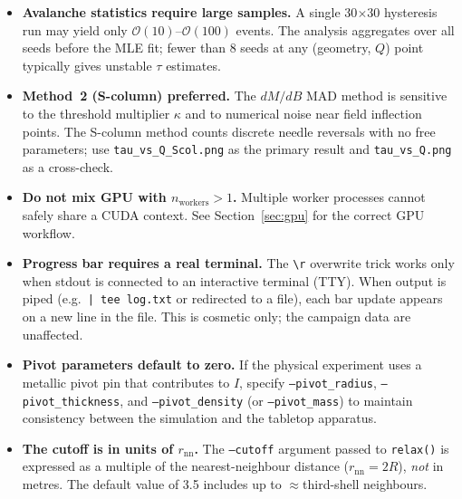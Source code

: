 \documentclass[11pt,a4paper]{article}
\newcommand{\code}[1]{\texttt{#1}}
\newcommand{\file}[1]{\texttt{#1}}
\newcommand{\param}[1]{\texttt{--#1}}
\begin{document}
\begin{itemize}
  \item \textbf{Avalanche statistics require large samples.}  A single 30$\times$30
    hysteresis run may yield only $\mathcal{O}(10)$--$\mathcal{O}(100)$ events.
    The analysis aggregates over all seeds before the MLE fit; fewer than
    8 seeds at any (geometry, $Q$) point typically gives unstable $\tau$ estimates.

  \item \textbf{Method~2 (S-column) preferred.}  The $dM/dB$ MAD method is sensitive
    to the threshold multiplier $\kappa$ and to numerical noise near field
    inflection points.  The S-column method counts discrete needle reversals
    with no free parameters; use \file{tau\_vs\_Q\_Scol.png} as the primary result
    and \file{tau\_vs\_Q.png} as a cross-check.

  \item \textbf{Do not mix GPU with $n_{\mathrm{workers}} > 1$.}  Multiple worker
    processes cannot safely share a CUDA context.  See
    Section~\ref{sec:gpu} for the correct GPU workflow.

  \item \textbf{Progress bar requires a real terminal.}  The \texttt{\textbackslash r}
    overwrite trick works only when stdout is connected to an interactive
    terminal (TTY).  When output is piped (e.g.\ \texttt{| tee log.txt} or
    redirected to a file), each bar update appears on a new line in the file.
    This is cosmetic only; the campaign data are unaffected.

  \item \textbf{Pivot parameters default to zero.}  If the physical experiment uses
    a metallic pivot pin that contributes to $I$, specify \param{pivot\_radius},
    \param{pivot\_thickness}, and \param{pivot\_density} (or \param{pivot\_mass})
    to maintain consistency between the simulation and the tabletop apparatus.

  \item \textbf{The cutoff is in units of $r_{\mathrm{nn}}$.}  The \param{cutoff}
    argument passed to \code{relax()} is expressed as a multiple of the
    nearest-neighbour distance ($r_{\mathrm{nn}} = 2R$), \textit{not} in metres.
    The default value of 3.5 includes up to $\approx$third-shell neighbours.
\end{itemize}
\end{document}
